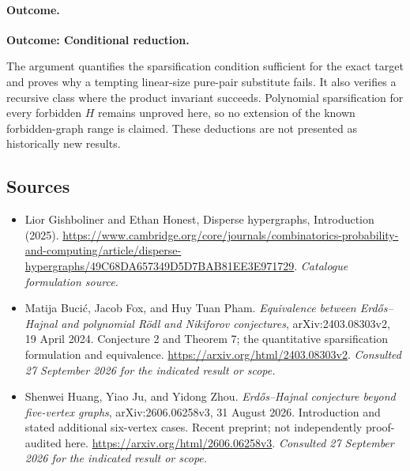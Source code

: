 \documentclass[11pt,a4paper]{article}
\numberwithin{equation}{section}
\begin{document}
\paragraph{Outcome.}
\textbf{Outcome: Conditional reduction.}

The argument quantifies the sparsification condition sufficient for
the exact target and proves why a tempting linear-size pure-pair
substitute fails.  It also verifies a recursive class where the product
invariant succeeds.  Polynomial sparsification for every forbidden
$H$ remains unproved here, so no extension of the known forbidden-graph
range is claimed.  These deductions are not presented as historically
new results.
\subsection{Sources}
\begin{itemize}\raggedright
\item[\textnormal{[S1]}]\hypertarget{source:126:1}{} Lior Gishboliner and Ethan Honest, Disperse hypergraphs, Introduction (2025).
\url{https://www.cambridge.org/core/journals/combinatorics-probability-and-computing/article/disperse-hypergraphs/49C68DA657349D5D7BAB81EE3E971729}.
{\small\textit{Catalogue formulation source.}}
\item[\textnormal{[E1]}]\hypertarget{extra:126:1}{} Matija Buci\'c, Jacob Fox, and Huy Tuan Pham.
\emph{Equivalence between Erd\H{o}s--Hajnal and polynomial R\"odl and Nikiforov conjectures}, arXiv:2403.08303v2, 19 April 2024. Conjecture 2 and Theorem 7; the quantitative sparsification formulation and equivalence.
\url{https://arxiv.org/html/2403.08303v2}.
{\small\textit{Consulted 27 September 2026 for the indicated result or scope.}}
\item[\textnormal{[E2]}]\hypertarget{extra:126:2}{} Shenwei Huang, Yiao Ju, and Yidong Zhou.
\emph{Erd\H{o}s--Hajnal conjecture beyond five-vertex graphs}, arXiv:2606.06258v3, 31 August 2026. Introduction and stated additional six-vertex cases. Recent preprint; not independently proof-audited here.
\url{https://arxiv.org/html/2606.06258v3}.
{\small\textit{Consulted 27 September 2026 for the indicated result or scope.}}
\end{itemize}
\end{document}
